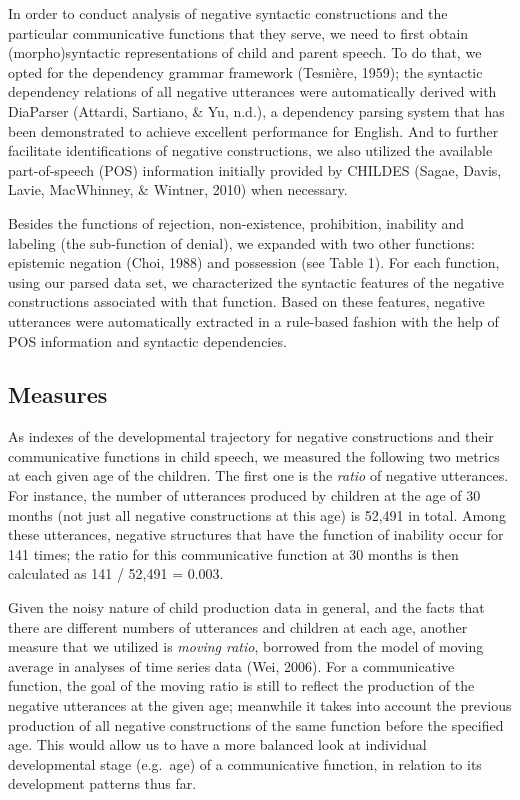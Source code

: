 \documentclass[10pt, letterpaper]{article}
\begin{document}
In order to conduct analysis of negative syntactic constructions and the
particular communicative functions that they serve, we need to first
obtain (morpho)syntactic representations of child and parent speech. To
do that, we opted for the dependency grammar framework (Tesnière, 1959);
the syntactic dependency relations of all negative utterances were
automatically derived with DiaParser (Attardi, Sartiano, \& Yu, n.d.), a
dependency parsing system that has been demonstrated to achieve
excellent performance for English. And to further facilitate
identifications of negative constructions, we also utilized the
available part-of-speech (POS) information initially provided by CHILDES
(Sagae, Davis, Lavie, MacWhinney, \& Wintner, 2010) when necessary.

Besides the functions of rejection, non-existence, prohibition,
inability and labeling (the sub-function of denial), we expanded with
two other functions: epistemic negation (Choi, 1988) and possession (see
Table 1). For each function, using our parsed data set, we characterized
the syntactic features of the negative constructions associated with
that function. Based on these features, negative utterances were
automatically extracted in a rule-based fashion with the help of POS
information and syntactic dependencies.

\hypertarget{measures}{%
\subsection{Measures}\label{measures}}

As indexes of the developmental trajectory for negative constructions
and their communicative functions in child speech, we measured the
following two metrics at each given age of the children. The first one
is the \emph{ratio} of negative utterances. For instance, the number of
utterances produced by children at the age of 30 months (not just all
negative constructions at this age) is 52,491 in total. Among these
utterances, negative structures that have the function of inability
occur for 141 times; the ratio for this communicative function at 30
months is then calculated as 141 / 52,491 = 0.003.

Given the noisy nature of child production data in general, and the
facts that there are different numbers of utterances and children at
each age, another measure that we utilized is \emph{moving ratio},
borrowed from the model of moving average in analyses of time series
data (Wei, 2006). For a communicative function, the goal of the moving
ratio is still to reflect the production of the negative utterances at
the given age; meanwhile it takes into account the previous production
of all negative constructions of the same function before the specified
age. This would allow us to have a more balanced look at individual
developmental stage (e.g.~age) of a communicative function, in relation
to its development patterns thus far.
\end{document}
